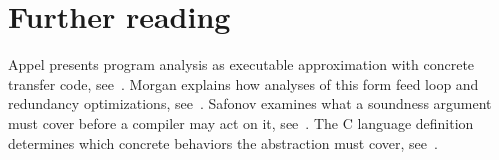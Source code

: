 \section{Further reading}
\label{sec:ch11-reading}

Appel presents program analysis as executable approximation with concrete transfer code, see~\cite{appel-1998-modern}.
Morgan explains how analyses of this form feed loop and redundancy optimizations, see~\cite{morgan-1998-optimizing}.
Safonov examines what a soundness argument must cover before a compiler may act on it, see~\cite{safonov-2010-trustworthy}.
The C language definition determines which concrete behaviors the abstraction must cover, see~\cite{wg14-2011-c11}.
